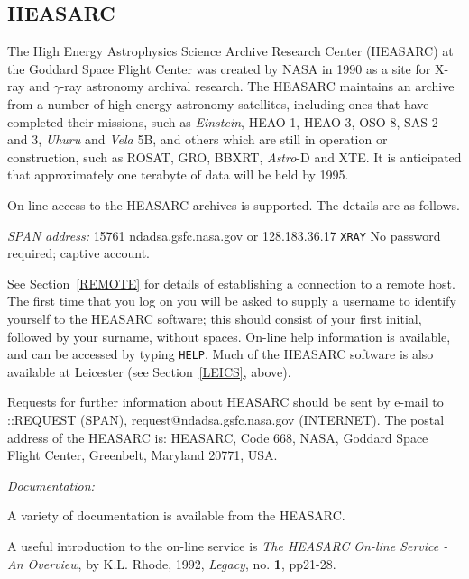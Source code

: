 \subsection{HEASARC
\label{HEASARC}}

The High Energy Astrophysics Science Archive Research Center (HEASARC)
at the Goddard Space Flight Center was created by NASA in 1990 as a site
for X-ray and $\gamma$-ray astronomy archival research. The HEASARC 
maintains an archive from a number of high-energy astronomy satellites,
including ones that have completed their missions, such as {\it 
Einstein}, HEAO 1, HEAO 3, OSO 8, SAS 2 and 3, {\it Uhuru} and {\it 
Vela} 5B, and others which are still in operation or construction, such 
as ROSAT, GRO, BBXRT, {\it Astro}-D and XTE. It is anticipated that 
approximately one terabyte of data will be held by 1995.

On-line access to the HEASARC archives is supported. The details are as 
follows.

{\it SPAN address: } 15761
 ndadsa.gsfc.nasa.gov or 128.183.36.17
 \verb-XRAY-
 No password required; captive account.

See Section~\ref{REMOTE} for details of establishing a connection to
a remote host. The first time that you log on you will be asked to 
supply a username to identify yourself to the HEASARC software; this 
should consist of your first initial, followed by your surname, without 
spaces. On-line help information is available, and can be accessed by 
typing \verb-HELP-. Much of the HEASARC software is also available at
Leicester (see Section~\ref{LEICS}, above).

Requests for further information about HEASARC should be sent by e-mail
to 
::REQUEST (SPAN), request@ndadsa.gsfc.nasa.gov (INTERNET).
The postal address of the HEASARC is: HEASARC, Code 668, NASA, Goddard 
Space Flight Center, Greenbelt, Maryland 20771, USA.

{\it Documentation:}

A variety of documentation is available from the HEASARC.

A useful introduction to the on-line service is {\it The HEASARC On-line
Service - An Overview}, by K.L. Rhode, 1992, {\it Legacy}, no. {\bf 1}, 
pp21-28.

